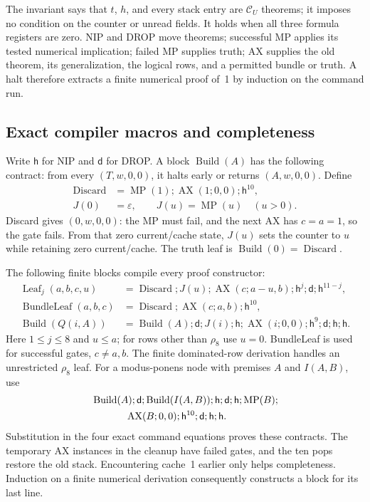 \documentclass[11pt]{article}
\newcommand{\CU}{\mathcal C_U}
\theoremstyle{definition}\newtheorem{definition}[theorem]{Definition}
\begin{document}
The invariant says that $t$, $h$, and every stack entry are $\CU$ theorems;
it imposes no condition on the counter or unread fields. It holds when all
three formula registers are zero. NIP and DROP move theorems; successful
MP applies its tested numerical implication; failed MP supplies truth;
AX supplies the old theorem, its generalization, the logical rows, and
a permitted bundle or truth. A halt therefore extracts a finite numerical
proof of~1 by induction on the command run.

\subsection{Exact compiler macros and completeness}

Write $\mathsf h$ for NIP and $\mathsf d$ for DROP. A block
$\operatorname{Build}(A)$ has the following contract: from every
$(T,w,0,0)$, it halts early or returns $(A,w,0,0)$. Define
\begin{align*}
 \operatorname{Discard}&=\operatorname{MP}(1);\operatorname{AX}(1;0,0);
                             \mathsf h^{10},\\
 J(0)&=\varepsilon,\qquad J(u)=\operatorname{MP}(u)\quad(u>0).
\end{align*}
Discard gives $(0,w,0,0)$: the MP must fail, and the next AX has $c=a=1$,
so the gate fails. From that zero current/cache state, $J(u)$ sets the
counter to $u$ while retaining zero current/cache.
The truth leaf is $\operatorname{Build}(0)=\operatorname{Discard}$.

The following finite blocks compile every proof constructor:
\begin{align*}
 \operatorname{Leaf}_j(a,b,c,u)
 &=\operatorname{Discard};J(u);\operatorname{AX}(c;a-u,b);
      \mathsf h^j;\mathsf d;\mathsf h^{11-j},\\
 \operatorname{BundleLeaf}(a,b,c)
 &=\operatorname{Discard};\operatorname{AX}(c;a,b);\mathsf h^{10},\\
 \operatorname{Build}(Q(i,A))
 &=\operatorname{Build}(A);\mathsf d;J(i);\mathsf h;
   \operatorname{AX}(i;0,0);\mathsf h^9;\mathsf d;\mathsf h;\mathsf h.
\end{align*}
Here $1\le j\le8$ and $u\le a$; for rows other than $\rho_8$ use $u=0$.
BundleLeaf is used for successful gates, $c\ne a,b$.
The finite dominated-row derivation handles an unrestricted $\rho_8$
leaf. For a modus-ponens node with premises $A$ and $I(A,B)$, use
\begin{align*}
 &\operatorname{Build}(A);\mathsf d;\operatorname{Build}(I(A,B));
 \mathsf h;\mathsf d;\mathsf h;\operatorname{MP}(B);\\
 &\hspace{12mm}\operatorname{AX}(B;0,0);\mathsf h^{10};
 \mathsf d;\mathsf h;\mathsf h.
\end{align*}
Substitution in the four exact command equations proves these contracts.
The temporary AX instances in the cleanup have failed gates, and the ten
pops restore the old stack. Encountering cache~1 earlier only helps
completeness. Induction on a finite numerical derivation consequently
constructs a block for its last line.
\end{document}
